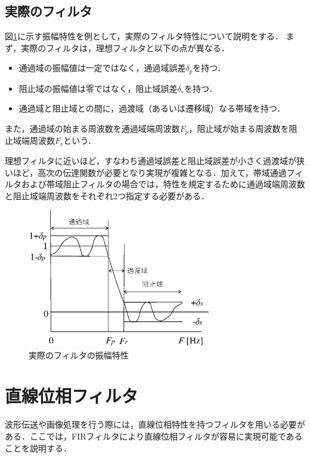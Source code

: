 \subsection{実際のフィルタ}

図\ref{fig:zu-6-5}に示す振幅特性を例として，実際のフィルタ特性について説明をする．
%
まず，実際のフィルタは，理想フィルタと以下の点が異なる．

\begin{itemize}
\item 通過域の振幅値は一定ではなく，通過域誤差$\delta_p$を持つ．
\item 阻止域の振幅値は零ではなく，阻止域誤差$\delta_s$を持つ．
\item 通過域と阻止域との間に，過渡域（あるいは遷移域）なる帯域を持つ．
\end{itemize}

また，通過域の始まる周波数を通過域端周波数$F_p$，阻止域が始まる周波数を阻止域端周波数$F_r$という．

理想フィルタに近いほど，すなわち通過域誤差と阻止域誤差が小さく過渡域が狭いほど，高次の伝達関数が必要となり実現が複雑となる．加えて，帯域通過フィルタおよび帯域阻止フィルタの場合では，特性を規定するために通過域端周波数と阻止域端周波数をそれぞれ2つ指定する必要がある．

\begin{figure}[H]
\begin{center}
\includegraphics[width=8cm]{fig/zu-6-5.eps}
\end{center}
\caption{実際のフィルタの振幅特性}
\label{fig:zu-6-5}
\end{figure}



\section{直線位相フィルタ}

波形伝送や画像処理を行う際には，直線位相特性を持つフィルタを用いる必要がある．ここでは，FIRフィルタにより直線位相フィルタが容易に実現可能であることを説明する．


